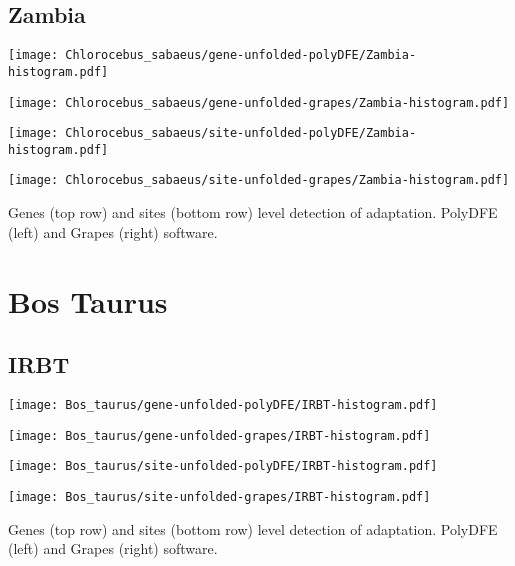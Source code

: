 \documentclass{article}
\begin{document}
\subsection{Zambia}
\centering
\begin{minipage}{0.49\linewidth}
    \texttt{[image: Chlorocebus\_sabaeus/gene-unfolded-polyDFE/Zambia-histogram.pdf]}
\end{minipage}%
\hfill
\begin{minipage}{0.49\linewidth}
    \texttt{[image: Chlorocebus\_sabaeus/gene-unfolded-grapes/Zambia-histogram.pdf]}
\end{minipage}
\begin{minipage}{0.49\linewidth}
    \texttt{[image: Chlorocebus\_sabaeus/site-unfolded-polyDFE/Zambia-histogram.pdf]}
\end{minipage}%
\hfill
\begin{minipage}{0.49\linewidth}
    \texttt{[image: Chlorocebus\_sabaeus/site-unfolded-grapes/Zambia-histogram.pdf]}
\end{minipage}
\flushleft
Genes (top row) and sites (bottom row) level detection of adaptation.
PolyDFE (left) and Grapes (right) software.


\section{Bos Taurus}

\subsection{IRBT}
\centering
\begin{minipage}{0.49\linewidth}
    \texttt{[image: Bos\_taurus/gene-unfolded-polyDFE/IRBT-histogram.pdf]}
\end{minipage}%
\hfill
\begin{minipage}{0.49\linewidth}
    \texttt{[image: Bos\_taurus/gene-unfolded-grapes/IRBT-histogram.pdf]}
\end{minipage}
\begin{minipage}{0.49\linewidth}
    \texttt{[image: Bos\_taurus/site-unfolded-polyDFE/IRBT-histogram.pdf]}
\end{minipage}%
\hfill
\begin{minipage}{0.49\linewidth}
    \texttt{[image: Bos\_taurus/site-unfolded-grapes/IRBT-histogram.pdf]}
\end{minipage}
\flushleft
Genes (top row) and sites (bottom row) level detection of adaptation.
PolyDFE (left) and Grapes (right) software.
\end{document}
